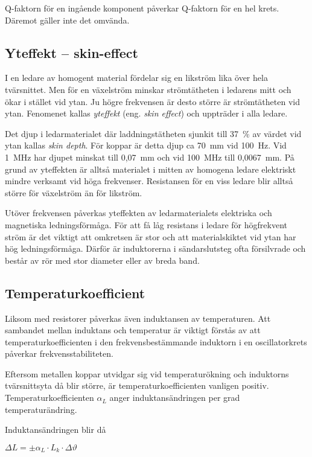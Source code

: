Q-faktorn för en ingående komponent påverkar Q-faktorn för en hel krets.
Däremot gäller inte det omvända.

\subsection{Yteffekt -- skin-effect}

I en ledare av homogent material fördelar sig en likström lika över hela
tvärsnittet. Men för en växelström minskar strömtätheten i ledarens mitt
och ökar i stället vid ytan.
Ju högre frekvensen är desto större är strömtätheten vid ytan.
Fenomenet kallas \emph{yteffekt} (eng. \emph{skin effect}) och uppträder i alla
ledare.

Det djup i ledarmaterialet där laddningstätheten sjunkit till 37~\% av
värdet vid ytan kallas \emph{skin depth}. För koppar är detta djup ca 70~mm vid
100~Hz. Vid 1~MHz har djupet minskat till 0,07~mm och vid 100~MHz till
0,0067~mm. På grund av yteffekten är alltså materialet i mitten av homogena
ledare elektriskt mindre verksamt vid höga frekvenser. Resistansen för en viss ledare 
blir alltså större för växelström än för likström.

Utöver frekvensen påverkas yteffekten av ledarmaterialets elektriska och
magnetiska ledningsförmåga. För att få låg resistans i ledare för högfrekvent
ström är det viktigt att omkretsen är stor och att materialskiktet vid ytan har
hög ledningsförmåga. Därför är induktorerna i sändarslutsteg ofta 
försilvrade och består av rör med stor diameter eller av breda band.

\subsection{Temperaturkoefficient}

Liksom med resistorer påverkas även induktansen av temperaturen. Att sambandet
mellan induktans och temperatur är viktigt förstås av att
temperaturkoefficienten i den frekvensbestämmande induktorn i en oscillatorkrets
påverkar frekvensstabiliteten.

Eftersom metallen koppar utvidgar sig vid temperaturökning och induktorns
tvärsnittsyta då blir större, är temperaturkoefficienten vanligen positiv.
Temperaturkoefficienten \(\alpha_L\) anger induktansändringen per grad
temperaturändring.

Induktansändringen blir då

\(\Delta L = \pm \alpha _L \cdot L_k \cdot \Delta\vartheta\)

